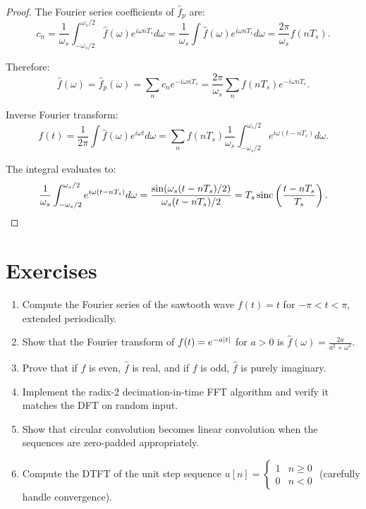 \begin{notechapter}
\begin{proof}
The Fourier series coefficients of $\hat{f}_p$ are:
\[
c_n = \frac{1}{\omega_s} \int_{-\omega_s/2}^{\omega_s/2} \hat{f}(\omega) e^{i\omega n T_s} d\omega = \frac{1}{\omega_s} \int \hat{f}(\omega) e^{i\omega n T_s} d\omega = \frac{2\pi}{\omega_s} f(nT_s).
\]

Therefore:
\[
\hat{f}(\omega) = \hat{f}_p(\omega) = \sum_n c_n e^{-i\omega n T_s} = \frac{2\pi}{\omega_s} \sum_n f(nT_s) e^{-i\omega n T_s}.
\]

Inverse Fourier transform:
\[
f(t) = \frac{1}{2\pi} \int \hat{f}(\omega) e^{i\omega t} d\omega = \sum_n f(nT_s) \frac{1}{\omega_s} \int_{-\omega_s/2}^{\omega_s/2} e^{i\omega(t - nT_s)} d\omega.
\]

The integral evaluates to:
\[
\frac{1}{\omega_s} \int_{-\omega_s/2}^{\omega_s/2} e^{i\omega(t - nT_s)} d\omega = \frac{\sin(\omega_s(t - nT_s)/2)}{\omega_s(t - nT_s)/2} = T_s \operatorname{sinc}\left(\frac{t - nT_s}{T_s}\right).
\]
\end{proof}

\section{Exercises}

\begin{enumerate}
\item Compute the Fourier series of the sawtooth wave $f(t) = t$ for $-\pi < t < \pi$, extended periodically.

\item Show that the Fourier transform of $f(t) = e^{-a\left|t\right|}$ for $a > 0$ is $\hat{f}(\omega) = \frac{2a}{a^2 + \omega^2}$.

\item Prove that if $f$ is even, $\hat{f}$ is real, and if $f$ is odd, $\hat{f}$ is purely imaginary.

\item Implement the radix-2 decimation-in-time FFT algorithm and verify it matches the DFT on random input.

\item Show that circular convolution becomes linear convolution when the sequences are zero-padded appropriately.

\item Compute the DTFT of the unit step sequence $u[n] = \begin{cases} 1 & n \geq 0 \\ 0 & n < 0 \end{cases}$ (carefully handle convergence).


\end{enumerate}
\end{notechapter}
